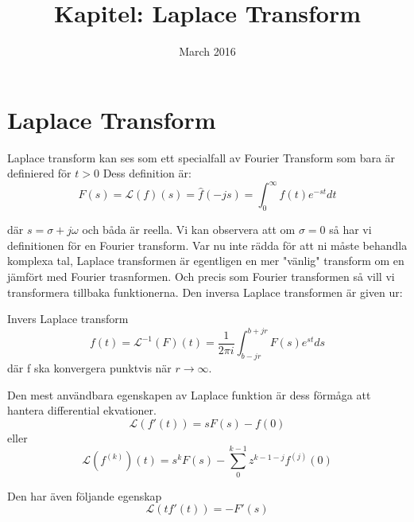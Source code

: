 \documentclass{article}
\title{Kapitel: Laplace Transform}
\author{ }
\date{March 2016}
\begin{document}
\maketitle

\section{Laplace Transform}



Laplace transform kan ses som ett specialfall av Fourier Transform som bara är definiered för $t>0$
Dess definition är:
$$F(s) = \mathcal{L} (f)(s) = \hat{f}(-js) = \int_{0}^{\infty} f(t)e^{-st} dt $$

där $s = \sigma + j \omega$ och båda är reella. Vi kan observera att om $\sigma = 0$ så har vi definitionen
för en Fourier transform. Var nu inte rädda för att ni måste behandla komplexa tal, Laplace transformen är
egentligen en mer "vänlig" transform om en jämfört med Fourier trasnformen. 
Och precis som Fourier transformen så vill vi transformera tillbaka funktionerna. 
Den inversa Laplace transformen är given ur:

Invers Laplace transform
$$f(t) = \mathcal{L}^{-1} (F)(t) = \frac{1}{2 \pi i} \int_{b-jr}^{b+jr} F(s) e^{st} ds $$
där f ska konvergera punktvis när $r\rightarrow \infty$.

Den mest användbara egenskapen av Laplace funktion är dess förmåga att hantera differential ekvationer.
$$\mathcal{L} (f'(t)) = s F(s) - f(0)$$
eller
$$\mathcal{L} (f^{(k)}) (t) = s^k F(s) - \sum_{0}^{k-1} z^{k-1-j} f^{(j)} (0)$$

Den har även följande egenskap 
$$\mathcal{L} (t f'(t)) = -F'(s) $$
\end{document}
